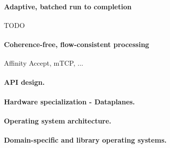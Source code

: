 \paragraph{Adaptive, batched run to completion}

\todo TODO

\paragraph{Coherence-free, flow-consistent processing}

\todo Affinity Accept, mTCP, ...



\paragraph{API design.}


\paragraph{Hardware specialization - Dataplanes.}

\paragraph{Operating system architecture.}

\paragraph{Domain-specific and library operating systems.}


